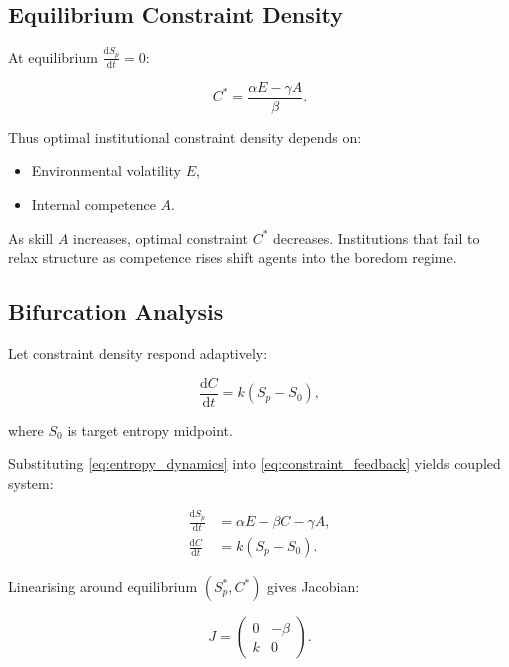 \documentclass[12pt,a4paper]{article}
\theoremstyle{definition}
\newcommand{\ddt}[1]{\frac{\mathrm{d}#1}{\mathrm{d}t}}
\begin{document}
\subsection{Equilibrium Constraint Density}

At equilibrium $\ddt{S_p} = 0$:

\begin{equation}
  C^* =
  \frac{\alpha E - \gamma A}{\beta}.
  \label{eq:Cstar}
\end{equation}

Thus optimal institutional constraint density depends on:

\begin{itemize}
  \item Environmental volatility $E$,
  \item Internal competence $A$.
\end{itemize}

As skill $A$ increases, optimal constraint $C^*$ decreases.
Institutions that fail to relax structure as competence rises
shift agents into the boredom regime.

\subsection{Bifurcation Analysis}

Let constraint density respond adaptively:

\begin{equation}
  \ddt{C} = k (S_p - S_0),
  \label{eq:constraint_feedback}
\end{equation}

where $S_0$ is target entropy midpoint.

Substituting \eqref{eq:entropy_dynamics} into \eqref{eq:constraint_feedback}
yields coupled system:

\begin{align}
  \ddt{S_p} &= \alpha E - \beta C - \gamma A, \\
  \ddt{C}   &= k (S_p - S_0).
\end{align}

Linearising around equilibrium $(S_p^*, C^*)$ gives Jacobian:

\begin{equation}
  J =
  \begin{pmatrix}
    0 & -\beta \\
    k & 0
  \end{pmatrix}.
\end{equation}
\end{document}
